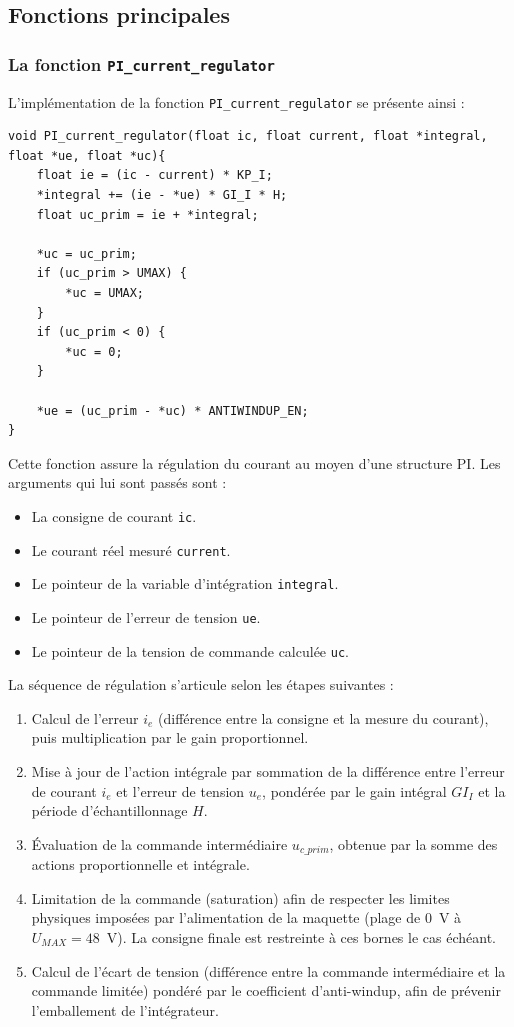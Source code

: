 \subsection{Fonctions principales}

\subsubsection{La fonction \texttt{PI\_current\_regulator}}
L'implémentation de la fonction \texttt{PI\_current\_regulator} se présente ainsi :

\begin{verbatim}
void PI_current_regulator(float ic, float current, float *integral,
float *ue, float *uc){
    float ie = (ic - current) * KP_I;
    *integral += (ie - *ue) * GI_I * H;
    float uc_prim = ie + *integral;

    *uc = uc_prim;
    if (uc_prim > UMAX) {
        *uc = UMAX;
    }
    if (uc_prim < 0) {
        *uc = 0;
    }

    *ue = (uc_prim - *uc) * ANTIWINDUP_EN;
}
\end{verbatim}

Cette fonction assure la régulation du courant au moyen d'une structure PI. Les arguments qui lui sont passés sont :

\begin{itemize}
    \item La consigne de courant \texttt{ic}.
    \item Le courant réel mesuré \texttt{current}.
    \item Le pointeur de la variable d'intégration \texttt{integral}.
    \item Le pointeur de l'erreur de tension \texttt{ue}.
    \item Le pointeur de la tension de commande calculée \texttt{uc}.
\end{itemize}

La séquence de régulation s'articule selon les étapes suivantes :

\begin{enumerate}
    \item Calcul de l'erreur $i_e$ (différence entre la consigne et la mesure du courant), puis multiplication par le gain proportionnel.
    \item Mise à jour de l'action intégrale par sommation de la différence entre l'erreur de courant $i_e$ et l'erreur de tension $u_e$, pondérée par le gain intégral $GI_I$ et la période d'échantillonnage $H$.
    \item Évaluation de la commande intermédiaire $u_{c\_prim}$, obtenue par la somme des actions proportionnelle et intégrale.
    \item Limitation de la commande (saturation) afin de respecter les limites physiques imposées par l'alimentation de la maquette (plage de 0~V à $U_{MAX} = 48$~V). La consigne finale est restreinte à ces bornes le cas échéant.
    \item Calcul de l'écart de tension (différence entre la commande intermédiaire et la commande limitée) pondéré par le coefficient d'anti-windup, afin de prévenir l'emballement de l'intégrateur.
\end{enumerate}

